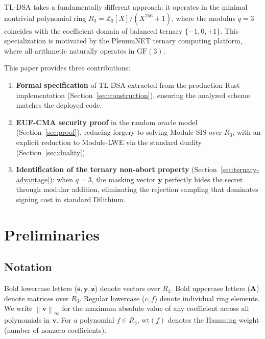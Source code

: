 \documentclass[11pt,a4paper]{article}
\theoremstyle{definition}
\newcommand{\Z}{\mathbb{Z}}
\newcommand{\GF}{\mathrm{GF}(3)}
\newcommand{\linf}[1]{\left\lVert #1 \right\rVert_{\infty}}
\newcommand{\wt}{\mathrm{wt}}
\begin{document}
TL-DSA takes a fundamentally different approach: it operates in the minimal nontrivial polynomial ring $R_3 = \Z_3[X]/(X^{256}+1)$, where the modulus $q=3$ coincides with the coefficient domain of balanced ternary $\{-1, 0, +1\}$. This specialization is motivated by the PlenumNET ternary computing platform, where all arithmetic naturally operates in $\GF$.

This paper provides three contributions:

\begin{enumerate}[leftmargin=2em]
\item \textbf{Formal specification} of TL-DSA extracted from the production Rust implementation (Section~\ref{sec:construction}), ensuring the analyzed scheme matches the deployed code.

\item \textbf{EUF-CMA security proof} in the random oracle model (Section~\ref{sec:proof}), reducing forgery to solving Module-SIS over $R_3$, with an explicit reduction to Module-LWE via the standard duality (Section~\ref{sec:duality}).

\item \textbf{Identification of the ternary non-abort property} (Section~\ref{sec:ternary-advantage}): when $q=3$, the masking vector $\mathbf{y}$ perfectly hides the secret through modular addition, eliminating the rejection sampling that dominates signing cost in standard Dilithium.
\end{enumerate}

\section{Preliminaries}
\label{sec:prelim}

\subsection{Notation}

Bold lowercase letters ($\mathbf{s}, \mathbf{y}, \mathbf{z}$) denote vectors over $R_3$. Bold uppercase letters ($\mathbf{A}$) denote matrices over $R_3$. Regular lowercase ($c, f$) denote individual ring elements. We write $\linf{\mathbf{v}}$ for the maximum absolute value of any coefficient across all polynomials in $\mathbf{v}$. For a polynomial $f \in R_3$, $\wt(f)$ denotes the Hamming weight (number of nonzero coefficients).
\end{document}
